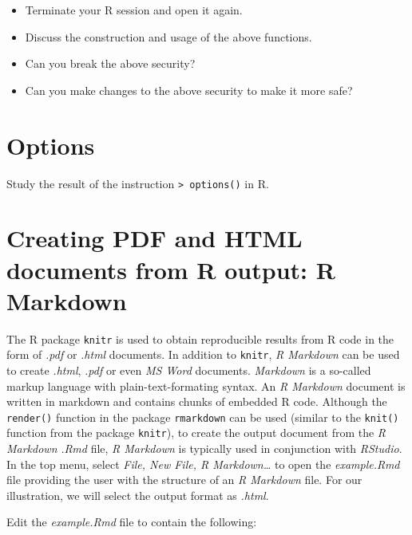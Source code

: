 \documentclass[
]{book}
\providecommand{\tightlist}{%
  \setlength{\itemsep}{0pt}\setlength{\parskip}{0pt}}
\begin{document}
\begin{itemize}
\tightlist
\item
  Terminate your R session and open it again.
\item
  Discuss the construction and usage of the above functions.
\item
  Can you break the above security?
\item
  Can you make changes to the above security to make it more safe?
\end{itemize}

\section{Options}\label{options}

Study the result of the instruction \texttt{\textgreater{}\ options()} in R.

\section{Creating PDF and HTML documents from R output: R Markdown}\label{creating-pdf-and-html-documents-from-r-output-r-markdown}

The R package \texttt{knitr} is used to obtain reproducible results from R code in the form of \emph{{.pdf}} or \emph{{.html}} documents. In addition to \texttt{knitr}, \emph{{R Markdown}} can be used to create \emph{{.html}}, \emph{{.pdf}} or even \emph{{MS Word}} documents. \emph{{Markdown}} is a so-called markup language with plain-text-formating syntax. An \emph{{R Markdown}} document is written in markdown and contains chunks of embedded R code. Although the \texttt{render()} function in the package \texttt{rmarkdown} can be used (similar to the \texttt{knit()} function from the package \texttt{knitr}), to create the output document from the \emph{{R Markdown}} \emph{{.Rmd}} file, \emph{{R Markdown}} is typically used in conjunction with \emph{{RStudio}}. In the top menu, select \emph{File, New File, R Markdown\ldots{}} to open the \emph{{example.Rmd}} file providing the user with the structure of an \emph{{R Markdown}} file. For our illustration, we will select the output format as \emph{{.html}}.

Edit the \emph{{example.Rmd}} file to contain the following:
\end{document}
